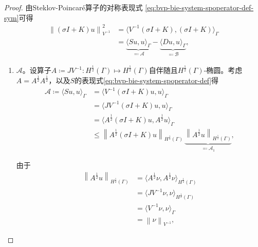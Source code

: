 \begin{proof}
由Steklov-Poincaré算子的对称表现式    \eqref{eq:bvp-bie-system-spoperator-def-sym}可得
\begin{equation*}
  \begin{split}
    \left\| \left(\sigma I + K \right) u \right\|_{V^{-1}}^{2}
    & = \langle
    V^{-1} \left(\sigma I + K \right), \left(\sigma I + K \right)
    \rangle_{\Gamma} \\
    & =
    \underbrace{
    \langle S u , u \rangle_{\Gamma}
    }_{\eqqcolon \mathcal{A}}
    - \underbrace{
    \langle D u, u \rangle_{\Gamma}
    }_{\eqqcolon \mathcal{B}},
  \end{split}
\end{equation*}
\begin{enumerate}
  \item $\mathcal{A}$。设算子$A \coloneqq J V^{-1}: H^{\frac{1}{2}}(\Gamma) \mapsto H^{\frac{1}{2}}(\Gamma)$自伴随且$H^{\frac{1}{2}}(\Gamma)$-椭圆。考虑$A = A^{\frac{1}{2}} A^{\frac{1}{2}}$，以及$S$的表现式\eqref{eq:bvp-bie-system-spoperator-def}得
  \begin{equation*}
    \begin{split}
      \mathcal{A} \coloneqq \langle S u, u \rangle_{\Gamma}
      & = \langle V^{-1} \left( \sigma I + K \right) u , u \rangle_{\Gamma} \\
      & = \langle
      J V^{-1} \left( \sigma I + K \right) u , u \rangle_{\Gamma} \\
      & = \langle
      A^{\frac{1}{2}} \left( \sigma I + K \right) u , A^{\frac{1}{2}} u \rangle_{\Gamma} \\
      & \le \left\|
      A^{\frac{1}{2}} \left( \sigma I + K \right) u
      \right\|_{H^{\frac{1}{2}}(\Gamma)} \,
      \underbrace{\left\| A^{\frac{1}{2}} u \right\|_{H^{\frac{1}{2}}(\Gamma)}
      }_{\eqqcolon \mathcal{A}_{1}},
    \end{split}
  \end{equation*}

由于
\begin{equation*}
  \begin{split}
    \left\| A^{\frac{1}{2}} u \right\|_{H^{\frac{1}{2}}(\Gamma)}
    & = \langle A^{\frac{1}{2}} \nu, A^{\frac{1}{2}} \nu \rangle_{H^{\frac{1}{2}}(\Gamma)} \\
    & = \langle J V^{-1} \nu, \nu \rangle_{H^{\frac{1}{2}}(\Gamma)} \\
    & = \langle V^{-1} \nu, \nu \rangle_{\Gamma} \\
    & = \left\| \nu \right\|_{V^{-1}},
  \end{split}
\end{equation*}


\end{enumerate}
\end{proof}
